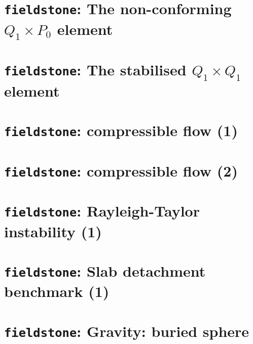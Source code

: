 \documentclass[a4paper]{article}
\begin{document}
\newpage
\section{{\tt fieldstone}: The non-conforming $Q_1 \times P_0$ element} \label{ncq1p0} 


\newpage
\section{{\tt fieldstone}: The stabilised $Q_1 \times Q_1$ element} 


\newpage
\section{{\tt fieldstone}: compressible flow (1)}


\newpage
\section{{\tt fieldstone}: compressible flow (2)}


\newpage
\section{{\tt fieldstone}: Rayleigh-Taylor instability (1)}


\newpage
\section{{\tt fieldstone}: Slab detachment benchmark (1)}


\newpage
\section{{\tt fieldstone}: Gravity: buried sphere}

\end{document}
